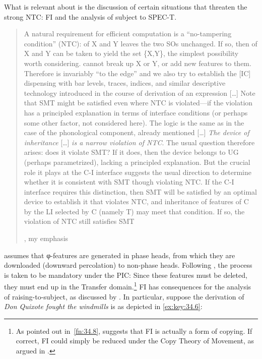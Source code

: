 \documentclass[output=paper]{langsci/langscibook}
\begin{document}
What is relevant about \citet{Chomsky2008} is the discussion of certain
situations that threaten the strong \gls{NTC}: \gls{FI} and the
analysis of subject  to SPEC-T.

\blockquote[{\citealt[138, 144]{Chomsky2008}, my emphasis}][.]{A natural
    requirement for efficient computation is a \enquote{no-tampering condition}
    (\gls{NTC}):  of X and Y leaves the two \glspl{SO} unchanged. If so, then
     of X and Y can be taken to yield the set \{X,Y\}, the simplest
    possibility worth considering.  cannot break up X or Y, or add new
    features to them.  Therefore  is invariably ``to the edge'' and we
    also try to establish the [IC] dispensing with bar levels, traces, indices,
    and similar descriptive technology introduced in the course of derivation
    of an expression [\dots{}] Note that \gls{SMT} might be satisfied even
    where \gls{NTC} is violated—if  the violation has a principled explanation
    in terms of interface conditions (or perhaps some other factor, not
    considered here). The logic is the same as in the case of the phonological
    component, already mentioned [\dots{}] \emph{The device of inheritance}
    [\dots{}] \emph{is a narrow violation of \gls{NTC}}. The usual question
    therefore arises: does it violate \gls{SMT}? If it does, then the device
    belongs to \gls{UG} (perhaps parametrized), lacking a principled
    explanation.  But the crucial role it plays at the C-I interface suggests
    the usual direction to determine whether it is consistent with \gls{SMT}
    though violating \gls{NTC}. If the C-I interface requires this distinction,
    then \gls{SMT} will be satisfied by an optimal device to establish it that
violates \gls{NTC}, and inheritance of features of C by the LI selected by C (namely
T) may meet that condition. If so, the violation of \gls{NTC} still satisfies
\gls{SMT}}

\citet{Chomsky2007,Chomsky2008} assumes that φ-features are generated in phase
heads, from which they are downloaded (downward percolation) to non-phase
heads. Following \citet{Richards2007}, the process is taken to be mandatory
under the \gls{PIC}: Since these features must be deleted, they must end up in
the Transfer domain.\footnote{As pointed out in~\cref{fn:34.8},
    \citet{Chomsky2013} suggests that \gls{FI} is actually a form of copying.
    If correct, \gls{FI} could simply be reduced under the Copy Theory of
Movement, as argued in \citet{Gallego2014}.} \gls{FI} has consequences for
the analysis of raising-to-subject, as discussed by \citet{EKS2012}. In
    particular, suppose the derivation of \emph{Don Quixote fought the
    windmills} is as depicted in \eqref{ex:key:34.6}:
\end{document}
